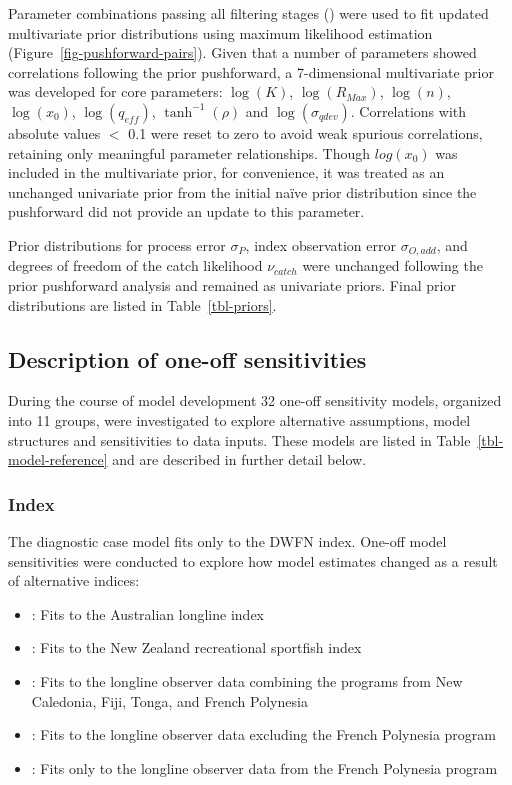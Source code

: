 \documentclass[
  11pt,
]{SCreport}
\providecommand{\tightlist}{%
  \setlength{\itemsep}{0pt}\setlength{\parskip}{0pt}}\usepackage{longtable,booktabs,array}
\begin{document}
Parameter combinations passing all filtering stages
() were used to fit updated multivariate prior
distributions using maximum likelihood estimation
(Figure~\ref{fig-pushforward-pairs}). Given that a number of parameters
showed correlations following the prior pushforward, a 7-dimensional
multivariate prior was developed for core parameters: \(\log(K)\),
\(\log(R_{Max})\), \(\log(n)\), \(\log(x_0)\), \(\log(q_{eff})\),
\(\tanh^{-1}(\rho)\) and \(\log(\sigma_{qdev})\). Correlations with
absolute values \(<\) 0.1 were reset to zero to avoid weak spurious
correlations, retaining only meaningful parameter relationships. Though
\(log(x_0)\) was included in the multivariate prior, for convenience, it
was treated as an unchanged univariate prior from the initial naïve
prior distribution since the pushforward did not provide an update to
this parameter.

Prior distributions for process error \(\sigma_P\), index observation
error \(\sigma_{O,add}\), and degrees of freedom of the catch likelihood
\(\nu_{catch}\) were unchanged following the prior pushforward analysis
and remained as univariate priors. Final prior distributions are listed
in Table~\ref{tbl-priors}.

\subsection{Description of one-off sensitivities}\label{sec-desc-sens}

During the course of model development 32 one-off sensitivity models,
organized into 11 groups, were investigated to explore alternative
assumptions, model structures and sensitivities to data inputs. These
models are listed in Table~\ref{tbl-model-reference} and are described
in further detail below.

\subsubsection{Index}\label{sec-desc-sens-index}

The diagnostic case model fits only to the DWFN index. One-off model
sensitivities were conducted to explore how model estimates changed as a
result of alternative indices:

\begin{itemize}
\tightlist
\item
  : Fits to the Australian longline index
\item
  : Fits to the New Zealand recreational sportfish
  index
\item
  : Fits to the longline observer data combining the
  programs from New Caledonia, Fiji, Tonga, and French Polynesia
\item
  : Fits to the longline observer data excluding the
  French Polynesia program
\item
  : Fits only to the longline observer data from the
  French Polynesia program
\end{itemize}
\end{document}
